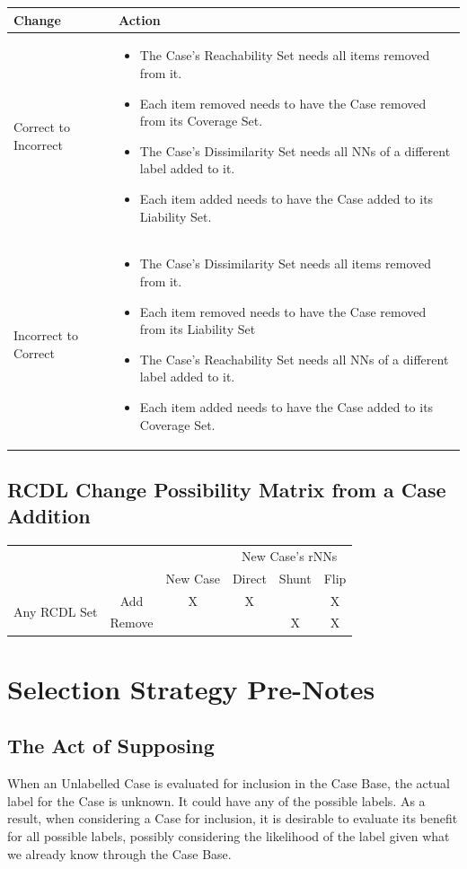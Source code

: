 \documentclass[a4paper,11pt]{report}
\begin{document}
\begin{tabular}{|x{60pt}|x{300pt}|}
\hline 
Change & Action \tabularnewline 
\hline 
Correct to Incorrect & 
\begin{itemize}
	\item The Case's Reachability Set needs all items removed from it.
	\item Each item removed needs to have the Case removed from its Coverage Set.
	\item The Case's Dissimilarity Set needs all NNs of a different label added to it.
	\item Each item added needs to have the Case added to its Liability Set.
\end{itemize} \tabularnewline 
\hline 
Incorrect to Correct & 
\begin{itemize}
	\item The Case's Dissimilarity Set needs all items removed from it.
	\item Each item removed needs to have the Case removed from its Liability Set
	\item The Case's Reachability Set needs all NNs of a different label added to it.
	\item Each item added needs to have the Case added to its Coverage Set.
\end{itemize} \tabularnewline 
\hline 
\end{tabular}	

\subsection{RCDL Change Possibility Matrix from a Case Addition}
\begin{tabular}{|c|c|c|c|c|c|}
\cline{4-6} 
\multicolumn{1}{c}{} & \multicolumn{1}{c}{} &  & \multicolumn{3}{c|}{New Case's rNNs}\tabularnewline
\cline{3-6} 
\multicolumn{1}{c}{} &  & New Case & Direct & Shunt & Flip\tabularnewline
\hline
\multirow{2}{*}{Any RCDL Set} & Add & X & X &  & X\tabularnewline
\cline{2-6} 
 & Remove &  &  & X & X\tabularnewline
\hline 
\end{tabular}
	
\section{Selection Strategy Pre-Notes}
\subsection{The Act of Supposing}
When an Unlabelled Case is evaluated for inclusion in the Case Base, the actual label for the Case is unknown. It could have any of the possible labels. As a result, when considering a Case for inclusion, it is desirable to evaluate its benefit for all possible labels, possibly considering the likelihood of the label given what we already know through the Case Base.
\end{document}
